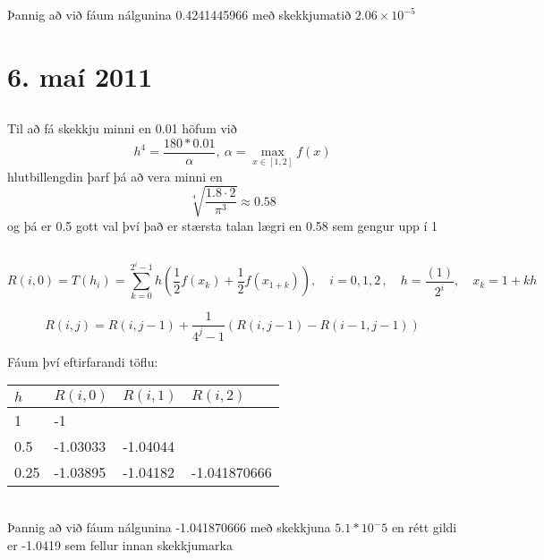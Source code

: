 \documentclass[10pt,a4paper]{article}
\begin{document}
Þannig að við fáum nálgunina 0.4241445966 með skekkjumatið $2.06 \times 10^{-5}$

\setcounter{section}{8}

\section{6. maí 2011}
\subsection{}
Til að fá skekkju minni en 0.01 höfum við $$h^4=\frac{180*0.01}{\alpha},\ \alpha = \max_{ x \in [1,2]}f(x) $$
hlutbillengdin þarf þá að vera minni en $$\sqrt[4]{\frac{1.8\cdot 2}{\pi^3}}\approx 0.58$$
og þá er 0.5 gott val því það er stærsta talan lægri en 0.58 sem gengur upp í 1 
\subsection{}
\[R(i,0)=T(h_i)=\sum_{k=0}^{2^i-1}h(\frac{1}{2}f(x_k) + \frac{1}{2}f(x_{1+k})),\quad i=0,1,2\, , \quad h=\frac{(1)}{2^i},\quad x_k =  1 + kh\]

\[
R(i,j)=R(i,j-1) + \frac{1}{4^j-1}(R(i,j-1)-R(i-1,j-1))
\]

Fáum því eftirfarandi töflu:

\begin{tabular}{l|lll}
$h$&$R(i,0)$&$R(i,1)$&$R(i,2)$\\ \hline
1	&-1\\
0.5	&-1.03033&-1.04044\\
0.25	&-1.03895&-1.04182&-1.041870666\\
\end{tabular}\\
Þannig að við fáum nálgunina -1.041870666 með skekkjuna $5.1*10^-5$ en rétt gildi er -1.0419 sem fellur innan skekkjumarka
\end{document}
